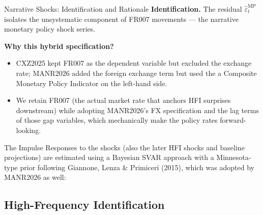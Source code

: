 \documentclass[10pt,aspectratio=169,t]{beamer}
\begin{document}
\begin{frame}{Narrative Shocks: Identification and Rationale}
\hypertarget{slide:rr2}{}
\textbf{Identification.} The residual $\widehat{\varepsilon}^{\text{MP}}_t$
isolates the unsystematic component of FR007 movements --- the narrative
monetary policy shock series.
\textcolor{spgray}{\scriptsize\hyperlink{app:rrfit}{}}
 
\vspace{0.2em}
\textbf{Why this hybrid specification?}
\begin{itemize}\itemsep0.1em
  \item[$\circ$] CXZ2025 kept FR007 as the dependent variable but excluded the
        exchange rate; MANR2026 added the foreign exchange term but used the a Composite Monetary Policy Indicator on the left-hand side.
        \textcolor{spgray}{\scriptsize\hyperlink{app:cmpi_fr007}{}}
  \item[$\circ$] We retain FR007 (the actual market rate that anchors HFI surprises
        downstream) while adopting MANR2026's FX specification and the lag terms of those gap variables, which mechanically make the policy rates forward-looking.
\end{itemize}
The Impulse Responses to the shocks (also the later HFI shocks and baseline projections) are estimated using a Bayesian SVAR approach with a Minnesota-type prior following Giannone, Lenza \& Primiceri (2015), which was adopted by MANR2026 as well:
\textcolor{spgray}{\scriptsize\hyperlink{app:narr_irf}{}}
 
\end{frame}

\subsection{High-Frequency Identification}
\end{document}
